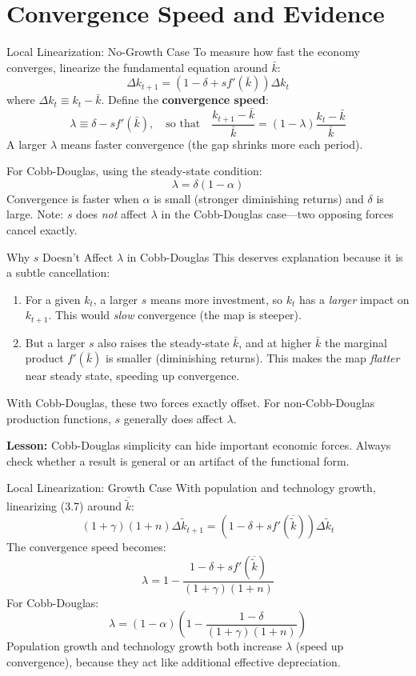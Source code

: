 \documentclass[aspectratio=169,10pt]{beamer}
\newcommand{\apxbutton}[1]{\hfill\hyperlink{#1}{\beamerbutton{Appendix}}}
\begin{document}
\section{Convergence Speed and Evidence}

\begin{frame}{Local Linearization: No-Growth Case}
\hypertarget{m-a12}{}
To measure how fast the economy converges, linearize the fundamental equation around $\bar{k}$:
\[
\Delta k_{t+1}=\left(1-\delta+s f'(\bar{k})\right)\Delta k_t \tag{3.10}
\]
where $\Delta k_t \equiv k_t - \bar{k}$. Define the \textbf{convergence speed}:
\[
\lambda\equiv \delta-s f'(\bar{k}), \quad\text{so that}\quad
\frac{k_{t+1}-\bar{k}}{\bar{k}}=(1-\lambda)\frac{k_t-\bar{k}}{\bar{k}}
\]
A larger $\lambda$ means faster convergence (the gap shrinks more each period).

\medskip
For Cobb-Douglas, using the steady-state condition:
\[
\lambda=\delta(1-\alpha) \tag{3.11}
\]
Convergence is faster when $\alpha$ is small (stronger diminishing returns) and $\delta$ is large. Note: $s$ does \emph{not} affect $\lambda$ in the Cobb-Douglas case---two opposing forces cancel exactly.
\apxbutton{a12}
\end{frame}

\begin{frame}{Why $s$ Doesn't Affect $\lambda$ in Cobb-Douglas}
This deserves explanation because it is a subtle cancellation:
\begin{enumerate}
  \item For a given $k_t$, a larger $s$ means more investment, so $k_t$ has a \emph{larger} impact on $k_{t+1}$. This would \emph{slow} convergence (the map is steeper).
  \item But a larger $s$ also raises the steady-state $\bar{k}$, and at higher $\bar{k}$ the marginal product $f'(\bar{k})$ is smaller (diminishing returns). This makes the map \emph{flatter} near steady state, speeding up convergence.
\end{enumerate}

With Cobb-Douglas, these two forces exactly offset. For non-Cobb-Douglas production functions, $s$ generally does affect $\lambda$.

\medskip
\textbf{Lesson:} Cobb-Douglas simplicity can hide important economic forces. Always check whether a result is general or an artifact of the functional form.
\end{frame}

\begin{frame}{Local Linearization: Growth Case}
\hypertarget{m-a13}{}
With population and technology growth, linearizing (3.7) around $\overline{\tilde{k}}$:
\[
(1+\gamma)(1+n)\Delta\tilde{k}_{t+1}=\left(1-\delta+s f'(\overline{\tilde{k}})\right)\Delta\tilde{k}_t \tag{3.12}
\]
The convergence speed becomes:
\[
\lambda = 1-\frac{1-\delta+s f'(\overline{\tilde{k}})}{(1+\gamma)(1+n)}
\]
For Cobb-Douglas:
\[
\lambda=(1-\alpha)\left(1-\frac{1-\delta}{(1+\gamma)(1+n)}\right) \tag{3.13}
\]
Population growth and technology growth both increase $\lambda$ (speed up convergence), because they act like additional effective depreciation.
\apxbutton{a13}
\end{frame}
\end{document}
